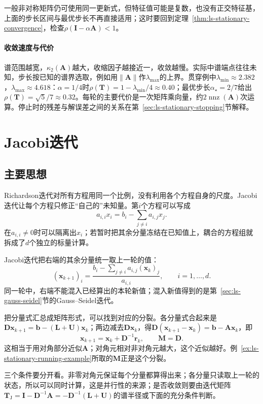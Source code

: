 一般非对称矩阵仍可使用同一更新式，但特征值可能是复数，也没有正交特征基，上面的步长区间与最优步长不再直接适用；这时要回到定理~\ref{thm:ls-stationary-convergence}，检查$\rho(\bm I-\alpha\bm A)<1$。

\paragraph{收敛速度与代价}
谱范围越宽，$\kappa_2(\bm A)$越大，收缩因子越接近一，收敛越慢。实际中谱端点往往未知，步长按已知的谱界选取，例如用$\lVert\bm A\rVert$作$\lambda_{\max}$的上界。贯穿例中$\lambda_{\min}\approx2.382$，$\lambda_{\max}\approx4.618$：$\alpha=1/4$时$\rho(\bm T)=1-\lambda_{\min}/4\approx0.40$；最优步长$\alpha_\star=2/7$给出$\rho(\bm T)=\sqrt5/7\approx0.32$。每轮的主要代价是一次矩阵乘向量，约$2\operatorname{nnz}(\bm A)$次运算。停止时的残差与解误差之间的关系在第~\ref{sec:ls-stationary-stopping}节解释。

\section{Jacobi迭代}
\label{sec:ls-jacobi}

\subsection{主要思想}

Richardson迭代对所有方程用同一个比例，没有利用各个方程自身的尺度。Jacobi迭代让每个方程只修正“自己的”未知量。第$i$个方程可以写成
\[
a_{i,i}x_i=b_i-\sum_{j\neq i}a_{i,j}x_j .
\]
在$a_{i,i}\neq0$时可以隔离出$x_i$；若暂时把其余分量冻结在已知值上，耦合的方程组就拆成了$d$个独立的标量计算。

Jacobi迭代把右端的其余分量统一取上一轮的值：
\[
(\bm x_{k+1})_i=\frac{b_i-\sum_{j\neq i}a_{i,j}(\bm x_k)_j}{a_{i,i}},\qquad i=1,\ldots,d .
\]
同一轮中，右端不能混入已经算出的本轮新值；混入新值得到的是第~\ref{sec:ls-gauss-seidel}节的Gauss--Seidel迭代。

把分量式汇总成矩阵形式，可以找到对应的分裂。各分量式合起来是$\bm D\bm x_{k+1}=\bm b-(\bm L+\bm U)\bm x_k$；两边减去$\bm D\bm x_k$，得$\bm D(\bm x_{k+1}-\bm x_k)=\bm b-\bm A\bm x_k$，即
\[
\bm x_{k+1}=\bm x_k+\bm D^{-1}\bm r_k ,\qquad \bm M=\bm D .
\]
这相当于用对角部分近似$\bm A$；对角元相对非对角元越大，这个近似越好。例~\ref{ex:ls-stationary-running-example}所取的$\bm M$正是这个分裂。

三个条件要分开看。非零对角元保证每个分量都算得出来；各分量只读取上一轮的状态，所以可以同时计算，这是并行性的来源；是否收敛则要由迭代矩阵$\bm T_{\mathrm J}=\bm I-\bm D^{-1}\bm A=-\bm D^{-1}(\bm L+\bm U)$的谱半径或下面的充分条件判断。

